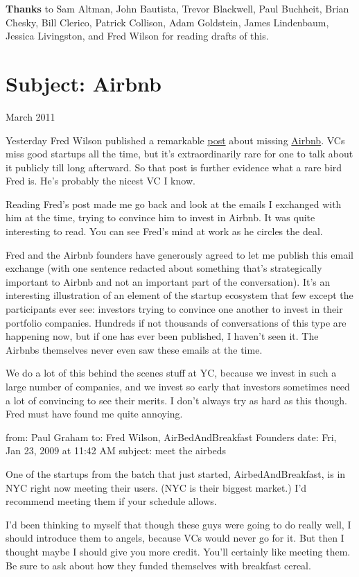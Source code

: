 \documentclass[12pt]{book}
\begin{document}
\textbf{Thanks} to Sam Altman, John Bautista, Trevor Blackwell, Paul
Buchheit, Brian Chesky, Bill Clerico, Patrick Collison, Adam Goldstein,
James Lindenbaum, Jessica Livingston, and Fred Wilson for reading drafts
of this.
\chapter{Subject: Airbnb}

March 2011

Yesterday Fred Wilson published a remarkable
\href{http://avc.com/2011/03/airbnb}{post} about missing
\href{http://airbnb.com}{Airbnb}. VCs miss good startups all the time,
but it's extraordinarily rare for one to talk about it publicly till
long afterward. So that post is further evidence what a rare bird Fred
is. He's probably the nicest VC I know.

Reading Fred's post made me go back and look at the emails I exchanged
with him at the time, trying to convince him to invest in Airbnb. It was
quite interesting to read. You can see Fred's mind at work as he circles
the deal.

Fred and the Airbnb founders have generously agreed to let me publish
this email exchange (with one sentence redacted about something that's
strategically important to Airbnb and not an important part of the
conversation). It's an interesting illustration of an element of the
startup ecosystem that few except the participants ever see: investors
trying to convince one another to invest in their portfolio companies.
Hundreds if not thousands of conversations of this type are happening
now, but if one has ever been published, I haven't seen it. The Airbnbs
themselves never even saw these emails at the time.

We do a lot of this behind the scenes stuff at YC, because we invest in
such a large number of companies, and we invest so early that investors
sometimes need a lot of convincing to see their merits. I don't always
try as hard as this though. Fred must have found me quite annoying.

from: Paul Graham to: Fred Wilson, AirBedAndBreakfast Founders date:
Fri, Jan 23, 2009 at 11:42 AM subject: meet the airbeds

One of the startups from the batch that just started,
AirbedAndBreakfast, is in NYC right now meeting their users. (NYC is
their biggest market.) I'd recommend meeting them if your schedule
allows.

I'd been thinking to myself that though these guys were going to do
really well, I should introduce them to angels, because VCs would never
go for it. But then I thought maybe I should give you more credit.
You'll certainly like meeting them. Be sure to ask about how they funded
themselves with breakfast cereal.
\end{document}
